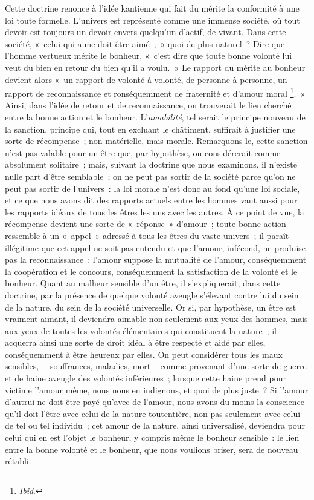 \documentclass[french,twoside]{book} %
\begin{document}
Cette doctrine renonce à l’idée kantienne qui fait du mérite la conformité à une loi toute formelle. L’univers est représenté comme une immense société, où tout devoir est toujours un devoir envers quelqu’un d’actif, de vivant. Dans cette société, « celui qui aime doit être aimé ; » quoi de plus naturel ? Dire que l’homme vertueux mérite le bonheur, « c’est dire que toute bonne volonté lui veut du bien en retour du bien qu’il a voulu. » Le rapport du mérite au bonheur devient alors « un rapport de volonté à volonté, de personne à personne, un rapport de reconnaissance et ronséquemment de fraternité et d’amour moral \footnote{\emph{Ibid}.}. » Ainsi, dans l’idée de retour et de reconnaissance, on trouverait le lien cherché entre la bonne action et le bonheur. L’\emph{amabilité}, tel serait le principe nouveau de la sanction, principe qui, tout en excluant le châtiment, suffirait à justifier une sorte de récompense ; non matérielle, mais morale. Remarquons-le, cette sanction n’est pas valable pour un être que, par hypothèse, on considérerait comme absolument solitaire ; mais, suivant la doctrine que nous examinons, il n’existe nulle part d’être semblable ; on ne peut pas sortir de la société parce qu’on ne peut pas sortir de l’univers : la loi morale n’est donc au fond qu’une loi sociale, et ce que nous avons dit des rapports actuels entre les hommes vaut aussi pour les rapports idéaux de tous les êtres les uns avec les autres. À ce point de vue, la récompense devient une sorte de « réponse » d’amour ; toute bonne action ressemble à un « appel » adressé à tous les êtres du vaste univers ; il paraît illégitime que cet appel ne soit pas entendu et que l’amour, infécond, ne produise pas la reconnaissance : l’amour suppose la mutualité de l’amour, conséquemment la coopération et le concours, conséquemment la satisfaction de la volonté et le bonheur. Quant au malheur sensible d’un être, il s’expliquerait, dans cette doctrine, par la présence de quelque volonté aveugle s’élevant contre lui du sein de la nature, du sein de la société universelle. Or si, par hypothèse, un être est vraiment aimant, il deviendra aimable non seulement aux yeux des hommes, mais aux yeux de toutes les volontés élémentaires qui constituent la nature ; il acquerra ainsi une sorte de droit idéal à être respecté et aidé par elles, conséquemment à être heureux par elles. On peut considérer tous les maux sensibles, – souffrances, maladies, mort – comme provenant d’une sorte de guerre et de haine aveugle des volontés inférieures ; lorsque cette haine prend pour victime l’amour même, nous nous en indignons, et quoi de plus juste ? Si l’amour d’autrui ne doit être payé qu’avec de l’amour, nous avons du moins la conscience qu’il doit l’être avec celui de la nature toutentière, non pas seulement avec celui de tel ou tel individu ; cet amour de la nature, ainsi universalisé, deviendra pour celui qui en est l’objet le bonheur, y compris même le bonheur sensible : le lien entre la bonne volonté et le bonheur, que nous voulions briser, sera de nouveau rétabli.\par
\end{document}
